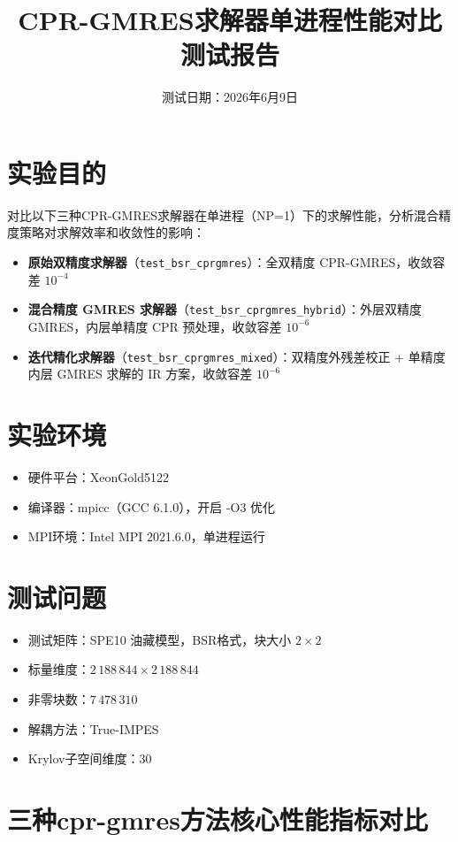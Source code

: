 \documentclass[12pt,a4paper]{article}
\title{CPR-GMRES求解器单进程性能对比测试报告}
\author{}
\date{测试日期：2026年6月9日}
\begin{document}
\maketitle

\section{实验目的}

对比以下三种CPR-GMRES求解器在单进程（NP=1）下的求解性能，分析混合精度策略对求解效率和收敛性的影响：
\begin{itemize}
  \item \textbf{原始双精度求解器}（\texttt{test\_bsr\_cprgmres}）：全双精度 CPR-GMRES，收敛容差 $10^{-4}$
  \item \textbf{混合精度 GMRES 求解器}（\texttt{test\_bsr\_cprgmres\_hybrid}）：外层双精度 GMRES，内层单精度 CPR 预处理，收敛容差 $10^{-6}$
  \item \textbf{迭代精化求解器}（\texttt{test\_bsr\_cprgmres\_mixed}）：双精度外残差校正 + 单精度内层 GMRES 求解的 IR 方案，收敛容差 $10^{-6}$
\end{itemize}

\section{实验环境}

\begin{itemize}
  \item 硬件平台：XeonGold5122
  \item 编译器：mpicc（GCC 6.1.0），开启 -O3 优化
  \item MPI环境：Intel MPI 2021.6.0，单进程运行
\end{itemize}

\section{测试问题}

\begin{itemize}
  \item 测试矩阵：SPE10 油藏模型，BSR格式，块大小 $2 \times 2$
  \item 标量维度：$2\,188\,844 \times 2\,188\,844$
  \item 非零块数：$7\,478\,310$
  \item 解耦方法：True-IMPES
  \item Krylov子空间维度：30
\end{itemize}

\section{三种cpr-gmres方法核心性能指标对比}
\end{document}
